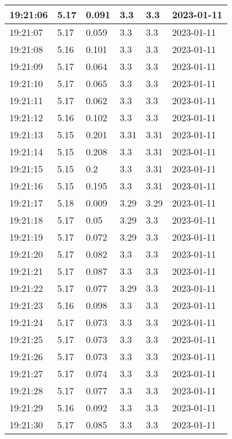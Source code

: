 \begin{longtable}{|l|l|l|l|l|l|}
        19:21:06 & 5.17 & 0.091 & 3.3 & 3.3 & 2023-01-11 \\ \hline
        19:21:07 & 5.17 & 0.059 & 3.3 & 3.3 & 2023-01-11 \\ \hline
        19:21:08 & 5.16 & 0.101 & 3.3 & 3.3 & 2023-01-11 \\ \hline
        19:21:09 & 5.17 & 0.064 & 3.3 & 3.3 & 2023-01-11 \\ \hline
        19:21:10 & 5.17 & 0.065 & 3.3 & 3.3 & 2023-01-11 \\ \hline
        19:21:11 & 5.17 & 0.062 & 3.3 & 3.3 & 2023-01-11 \\ \hline
        19:21:12 & 5.16 & 0.102 & 3.3 & 3.3 & 2023-01-11 \\ \hline
        19:21:13 & 5.15 & 0.201 & 3.31 & 3.31 & 2023-01-11 \\ \hline
        19:21:14 & 5.15 & 0.208 & 3.3 & 3.31 & 2023-01-11 \\ \hline
        19:21:15 & 5.15 & 0.2 & 3.3 & 3.31 & 2023-01-11 \\ \hline
        19:21:16 & 5.15 & 0.195 & 3.3 & 3.31 & 2023-01-11 \\ \hline
        19:21:17 & 5.18 & 0.009 & 3.29 & 3.29 & 2023-01-11 \\ \hline
        19:21:18 & 5.17 & 0.05 & 3.29 & 3.3 & 2023-01-11 \\ \hline
        19:21:19 & 5.17 & 0.072 & 3.29 & 3.3 & 2023-01-11 \\ \hline
        19:21:20 & 5.17 & 0.082 & 3.3 & 3.3 & 2023-01-11 \\ \hline
        19:21:21 & 5.17 & 0.087 & 3.3 & 3.3 & 2023-01-11 \\ \hline
        19:21:22 & 5.17 & 0.077 & 3.29 & 3.3 & 2023-01-11 \\ \hline
        19:21:23 & 5.16 & 0.098 & 3.3 & 3.3 & 2023-01-11 \\ \hline
        19:21:24 & 5.17 & 0.073 & 3.3 & 3.3 & 2023-01-11 \\ \hline
        19:21:25 & 5.17 & 0.073 & 3.3 & 3.3 & 2023-01-11 \\ \hline
        19:21:26 & 5.17 & 0.073 & 3.3 & 3.3 & 2023-01-11 \\ \hline
        19:21:27 & 5.17 & 0.074 & 3.3 & 3.3 & 2023-01-11 \\ \hline
        19:21:28 & 5.17 & 0.077 & 3.3 & 3.3 & 2023-01-11 \\ \hline
        19:21:29 & 5.16 & 0.092 & 3.3 & 3.3 & 2023-01-11 \\ \hline
        19:21:30 & 5.17 & 0.085 & 3.3 & 3.3 & 2023-01-11 \\ \hline

\end{longtable}
